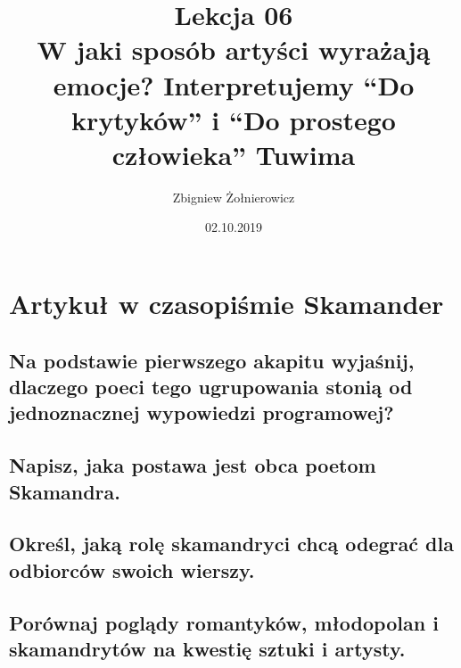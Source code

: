 \documentclass[a4paper]{article}
\begin{document}
\title{{\huge Lekcja 06} \\
{\large W jaki sposób artyści wyrażają emocje? Interpretujemy ``Do krytyków'' i ``Do prostego człowieka'' Tuwima}}
\author{Zbigniew Żołnierowicz}
\date{02.10.2019}
\maketitle
\section{Artykuł w czasopiśmie Skamander}
\subsection{Na podstawie pierwszego akapitu wyjaśnij, dla\-czego poeci tego ugrupowania stonią od jednoznacznej wy\-powiedzi programowej?}
\subsection{Napisz, jaka postawa jest obca poetom Skamandra.}
\subsection{Określ, jaką rolę skamandryci chcą odegrać dla odbiorców swoich wierszy.}
\subsection{Porównaj poglądy romantyków, młodopolan i \\ skamandrytów na kwestię sztuki i artysty.}
\begin{table}[H]
    \centering
\end{table}
\end{document}
